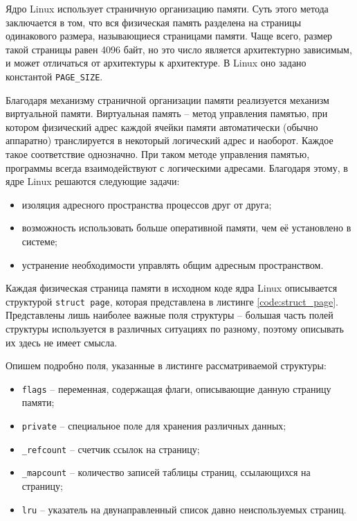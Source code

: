 \documentclass[12pt, a4paper]{article}
\begin{document}
Ядро Linux использует страничную организацию памяти. Суть этого метода заключается в том, что вся физическая память разделена на страницы одинакового размера, называющиеся страницами памяти. Чаще всего, размер такой страницы равен 4096 байт, но это число является архитектурно зависимым, и может отличаться от архитектуры к архитектуре. В Linux оно задано константой \texttt{PAGE\_SIZE}.

Благодаря механизму страничной организации памяти реализуется механизм виртуальной памяти. Виртуальная память -- метод управления памятью, при котором физический адрес каждой ячейки памяти автоматически (обычно аппаратно) транслируется в некоторый логический адрес и наоборот. Каждое такое соответствие однозначно. При таком методе управления памятью, программы всегда взаимодействуют с логическими адресами. Благодаря этому, в ядре Linux решаются следующие задачи:

\begin{itemize}
	\item изоляция адресного пространства процессов друг от друга;
	\item возможность использовать больше оперативной памяти, чем её установлено в системе;
	\item устранение необходимости управлять общим адресным пространством.
\end{itemize}

Каждая физическая страница памяти в исходном коде ядра Linux описывается структурой \texttt{struct page}, которая представлена в листинге \ref{code:struct_page}. Представлены лишь наиболее важные поля структуры -- большая часть полей структуры используется в различных ситуациях по разному, поэтому описывать их здесь не имеет смысла.


Опишем подробно поля, указанные в листинге рассматриваемой структуры:

\begin{itemize}
	\item \texttt{flags} -- переменная, содержащая флаги, описывающие данную страницу памяти;
	\item \texttt{private} -- специальное поле для хранения различных данных;
	\item \texttt{\_refcount} -- счетчик ссылок на страницу;
	\item \texttt{\_mapcount} -- количество записей таблицы страниц, ссылающихся на страницу;
	\item \texttt{lru} -- указатель на двунаправленный список давно неиспользуемых страниц.
\end{itemize}
\end{document}
